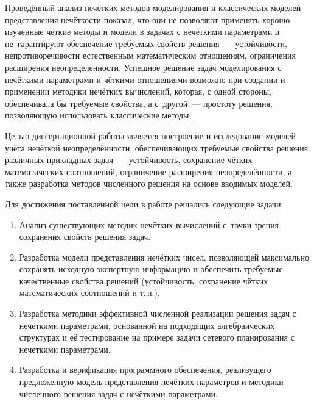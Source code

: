 Проведённый анализ нечётких методов моделирования и классических моделей представления нечёткости показал, что они не позволяют применять хорошо изученные чёткие методы и модели в задачах с нечёткими параметрами и не~гарантируют обеспечение требуемых свойств решения~--- устойчивости, непротиворечивости естественным математическим отношениям, ограничения расширения неопределенности. Успешное решение задач моделирования с нечёткими параметрами и чёткими отношениями возможно при создании и применении методики нечётких вычислений, которая, с одной стороны, обеспечивала бы требуемые свойства, а с~другой~--- простоту решения, позволяющую использовать классические методы.

Целью диссертационной работы является построение и исследование моделей учёта нечёткой неопределённости, обеспечивающих требуемые свойства решения различных прикладных задач~--- устойчивость, сохранение чётких математических соотношений, ограничение расширения неопределённости, а также разработка методов численного решения на основе вводимых моделей. 

Для достижения поставленной цели в работе решались следующие задачи:
\begin{enumerate}
  \item Анализ существующих методик нечётких вычислений с~точки зрения сохранения свойств решения задач.
  \item Разработка модели представления нечётких чисел, позволяющей максимально сохранять исходную экспертную информацию и обеспечить требуемые качественные свойства решений (устойчивость, сохранение чётких математических соотношений и т.\,п.).
  \item Разработка методики эффективной численной реализации решения задач с нечёткими параметрами, основанной на подходящих алгебраических структурах и её тестирование на примере задачи сетевого планирования с нечёткими параметрами.
  \item Разработка и верификация программного обеспечения, реализущего предложенную модель представления нечётких параметров и методики численного решения задач с нечёткими параметрами.
\end{enumerate}